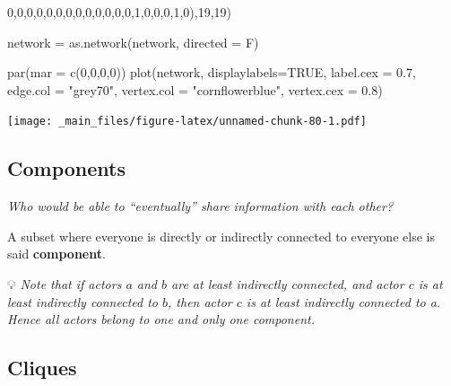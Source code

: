 \documentclass[
  notitlepage,
  onecolumn,
  openany]{book}
\newenvironment{Shaded}{\begin{snugshade}}{\end{snugshade}}
\newcommand{\AttributeTok}[1]{\textcolor[rgb]{0.77,0.63,0.00}{#1}}
\newcommand{\ConstantTok}[1]{\textcolor[rgb]{0.00,0.00,0.00}{#1}}
\newcommand{\DecValTok}[1]{\textcolor[rgb]{0.00,0.00,0.81}{#1}}
\newcommand{\FloatTok}[1]{\textcolor[rgb]{0.00,0.00,0.81}{#1}}
\newcommand{\FunctionTok}[1]{\textcolor[rgb]{0.00,0.00,0.00}{#1}}
\newcommand{\NormalTok}[1]{#1}
\newcommand{\OtherTok}[1]{\textcolor[rgb]{0.56,0.35,0.01}{#1}}
\newcommand{\StringTok}[1]{\textcolor[rgb]{0.31,0.60,0.02}{#1}}
\begin{document}
\begin{Shaded}
\begin{Highlighting}[]
  \DecValTok{0}\NormalTok{,}\DecValTok{0}\NormalTok{,}\DecValTok{0}\NormalTok{,}\DecValTok{0}\NormalTok{,}\DecValTok{0}\NormalTok{,}\DecValTok{0}\NormalTok{,}\DecValTok{0}\NormalTok{,}\DecValTok{0}\NormalTok{,}\DecValTok{0}\NormalTok{,}\DecValTok{0}\NormalTok{,}\DecValTok{0}\NormalTok{,}\DecValTok{0}\NormalTok{,}\DecValTok{0}\NormalTok{,}\DecValTok{1}\NormalTok{,}\DecValTok{0}\NormalTok{,}\DecValTok{0}\NormalTok{,}\DecValTok{0}\NormalTok{,}\DecValTok{1}\NormalTok{,}\DecValTok{0}\NormalTok{),}\DecValTok{19}\NormalTok{,}\DecValTok{19}\NormalTok{)}

\NormalTok{network }\OtherTok{=} \FunctionTok{as.network}\NormalTok{(network, }\AttributeTok{directed =}\NormalTok{ F)}

\FunctionTok{par}\NormalTok{(}\AttributeTok{mar =} \FunctionTok{c}\NormalTok{(}\DecValTok{0}\NormalTok{,}\DecValTok{0}\NormalTok{,}\DecValTok{0}\NormalTok{,}\DecValTok{0}\NormalTok{))}
\FunctionTok{plot}\NormalTok{(network,}
     \AttributeTok{displaylabels=}\ConstantTok{TRUE}\NormalTok{,}
     \AttributeTok{label.cex =} \FloatTok{0.7}\NormalTok{,}
     \AttributeTok{edge.col =} \StringTok{"grey70"}\NormalTok{,}
     \AttributeTok{vertex.col =} \StringTok{"cornflowerblue"}\NormalTok{,}
     \AttributeTok{vertex.cex =} \FloatTok{0.8}\NormalTok{)}
\end{Highlighting}
\end{Shaded}

\texttt{[image: \_main\_files/figure-latex/unnamed-chunk-80-1.pdf]}

\hypertarget{components-1}{%
\subsection{Components}\label{components-1}}

\emph{Who would be able to ``eventually'' share information with each other?}

A subset where everyone is directly or indirectly connected to everyone else is said \textbf{component}.

💡 \emph{Note that if actors \(a\) and \(b\) are at least indirectly connected, and actor \(c\) is at least indirectly connected to \(b\), then actor \(c\) is at least indirectly connected to a. Hence all actors belong to one and only one component.}

\hypertarget{cliques}{%
\subsection{Cliques}\label{cliques}}
\end{document}
